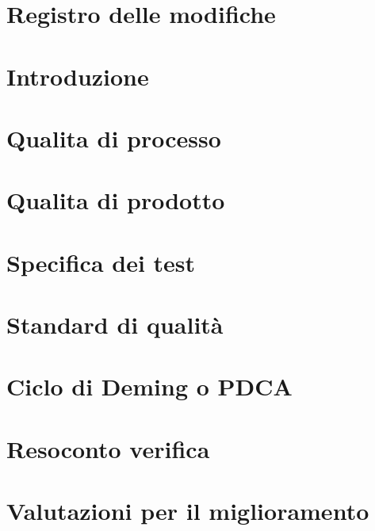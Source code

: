 \documentclass[a4paper, oneside, openany, dvipsnames, table]{article}
\begin{document}
\copertina{}

\section*{Registro delle modifiche}\label{sec:Registro-modifiche}


\newpage
\tableofcontents

\newpage
\listoftables

\newpage
\listoffigures

\newpage
\section{Introduzione}\label{sec:Introduzione}


\newpage
\section{Qualita di processo}\label{sec:Qualita-di-processo}


\newpage
\section{Qualita di prodotto}\label{sec:Qualita-di-prodotto}


\newpage
\section{Specifica dei test}\label{sec:Specifica-dei-test}


\appendix
\newpage
\section{Standard di qualità}\label{sec:Standard-di-qualita}


\section{Ciclo di Deming o PDCA}\label{sec:Ciclo-di-Deming}


\newpage
\section{Resoconto verifica}\label{sec:Resoconto-verifica}


\newpage
\section{Valutazioni per il miglioramento}\label{sec:Valutazioni-per-il-miglioramento}

\end{document}
